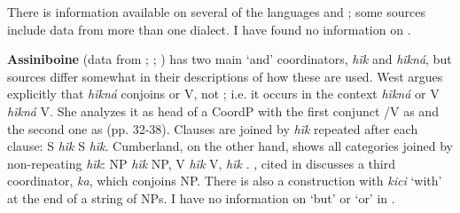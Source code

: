 \documentclass[output=paper]{LSP/langsci}
\begin{document}
There is information available on several of the  languages and ; some sources include data from more than one dialect. I have found no information on .

\textbf{Assiniboine} (data from \citealt{West2003}; \citealt{Cumberland2005}; \citealt{Levin1964}) has two main `and' coordinators, \textit{h\~ik} and \textit{h\~ikná}, but sources differ somewhat in their descriptions of how these are used. West argues explicitly that \textit{h\~ikná} conjoins  or V, not ; i.e. it occurs in the context  \textit{h\~ikná}  or V \textit{h\~ikná} V. She analyzes it as head of a CoordP with the first conjunct /V as  and the second one as  (pp. 32-38). Clauses are joined by \textit{h\~ik} repeated after each clause: S \textit{h\~ik} S \textit{h\~ik}. Cumberland, on the other hand, shows all categories joined by non-repeating \textit{h\~ik}: NP \textit{h\~ik} NP, V \textit{h\~ik} V,  \textit{h\~ik} . \citet{Levin1964}, cited in \citet[36]{Stassen2000} discusses a third coordinator, \textit{ka}, which conjoins NP. There is also a  construction with \textit{kici} `with' at the end of a string of NPs. I have no information on `but' or `or' in .
\end{document}
